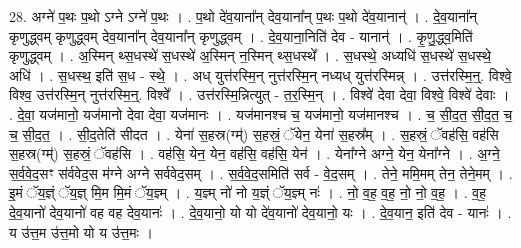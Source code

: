 \documentclass[17pt]{extarticle}
\begin{document}
28. अग्ने॑ प॒थः प॒थो ऽग्ने ऽग्ने॑ प॒थः । . प॒थो दे॑व॒याना᳚न् देव॒याना᳚न् प॒थः प॒थो दे॑व॒यानान्॑ । . दे॒व॒याना᳚न् कृणुद्ध्वम् कृणुद्ध्वम् देव॒याना᳚न् देव॒याना᳚न् कृणुद्ध्वम् । . दे॒व॒याना॒निति॑ देव - यानान्॑ । . कृ॒णु॒द्ध्व॒मिति॑ कृणुद्ध्वम् । . अ॒स्मिन् थ्स॒धस्थे॑ स॒धस्थे॑ अ॒स्मिन् न॒स्मिन् थ्स॒धस्थे᳚ । . स॒धस्थे॒ अध्यधि॑ स॒धस्थे॑ स॒धस्थे॒ अधि॑ । . स॒धस्थ॒ इति॑ स॒ध - स्थे॒ । . अध् युत्त॑रस्मि॒न् नुत्त॑रस्मि॒न् नध्यध् युत्त॑रस्मिन्न् । . उत्त॑रस्मि॒न्॒. विश्वे॒ विश्व॒ उत्त॑रस्मि॒न् नुत्त॑रस्मि॒न्॒. विश्वे᳚ । . उत्त॑रस्मि॒न्नित्युत् - त॒र॒स्मि॒न् । . विश्वे॑ देवा देवा॒ विश्वे॒ विश्वे॑ देवाः । . दे॒वा॒ यज॑मानो॒ यज॑मानो देवा देवा॒ यज॑मानः । . यज॑मानश्च च॒ यज॑मानो॒ यज॑मानश्च । . च॒ सी॒द॒त॒ सी॒द॒त॒ च॒ च॒ सी॒द॒त॒ । . सी॒द॒तेति॑ सीदत । . येना॑ स॒हस्र(ग्म्॑) स॒हस्रं॒ ॅयेन॒ येना॑ स॒हस्र᳚म् । . स॒हस्रं॒ ॅवह॑सि॒ वह॑सि स॒हस्र(ग्म्॑) स॒हस्रं॒ ॅवह॑सि । . वह॑सि॒ येन॒ येन॒ वह॑सि॒ वह॑सि॒ येन॑ । . येना᳚ग्ने अग्ने॒ येन॒ येना᳚ग्ने । . अ॒ग्ने॒ स॒र्व॒वे॒द॒सꣳ स॑र्ववेद॒स म॑ग्ने अग्ने सर्ववेद॒सम् । . स॒र्व॒वे॒द॒समिति॑ सर्व - वे॒द॒सम् । . तेने॒ ममि॒मम् तेन॒ तेने॒मम् । . इ॒मं ॅय॒ज्ञ्ं ॅय॒ज्ञ् मि॒म मि॒मं ॅय॒ज्ञ्म् । . य॒ज्ञ्म् नो॑ नो य॒ज्ञ्ं ॅय॒ज्ञ्म् नः॑ । . नो॒ व॒ह॒ व॒ह॒ नो॒ नो॒ व॒ह॒ । . व॒ह॒ दे॒व॒यानो॑ देव॒यानो॑ वह वह देव॒यानः॑ । . दे॒व॒यानो॒ यो यो दे॑व॒यानो॑ देव॒यानो॒ यः । . दे॒व॒यान॒ इति॑ देव - यानः॑ । . य उ॑त्त॒म उ॑त्त॒मो यो य उ॑त्त॒मः । \newline
\end{document}
